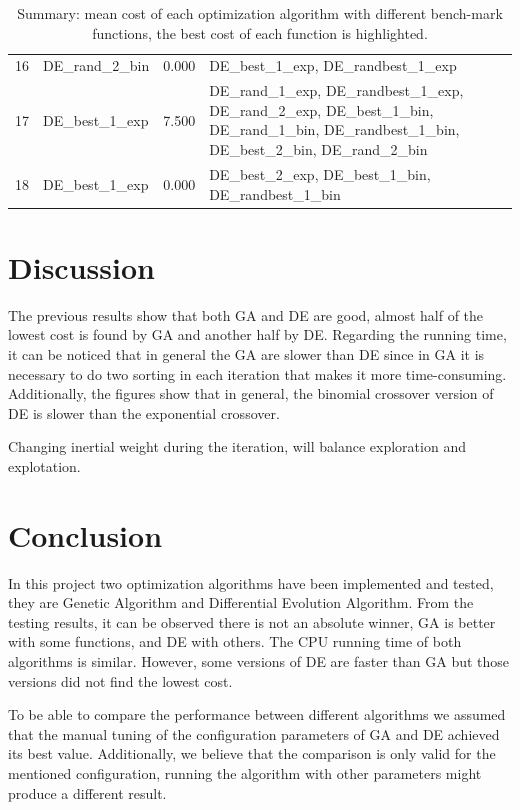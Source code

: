 \documentclass[12pt]{article}
\begin{document}
\begin{table}[H]
\begin{tabular}{rlrp{}}
 16 &  DE\_rand\_2\_bin & 0.000 &  DE\_best\_1\_exp, DE\_randbest\_1\_exp \\
 17 &  DE\_best\_1\_exp & 7.500 &  DE\_rand\_1\_exp, DE\_randbest\_1\_exp, DE\_rand\_2\_exp, DE\_best\_1\_bin, DE\_rand\_1\_bin, DE\_randbest\_1\_bin, DE\_best\_2\_bin, DE\_rand\_2\_bin \\
 18 &  DE\_best\_1\_exp & 0.000 &  DE\_best\_2\_exp, DE\_best\_1\_bin, DE\_randbest\_1\_bin \\
\bottomrule
\end{tabular}
\caption{Summary: mean cost of each optimization algorithm with different bench-mark functions, the best cost of each function is highlighted.} 
    \label{tab:summary_best}
\end{table}


\section{Discussion}

The previous results show that both GA and DE are good, almost half of the lowest cost is found by GA and another half by DE. Regarding the running time, it can be noticed that in general the GA are slower than DE since in GA it is necessary to do two sorting in each iteration that makes it more time-consuming. Additionally, the figures show that in general, the binomial crossover version of DE is slower than the exponential crossover.



Changing inertial weight during the iteration, will balance exploration and explotation. 

    \section{Conclusion}
    In this project two optimization algorithms have been implemented and tested, they are Genetic Algorithm and Differential Evolution Algorithm. From the testing results, it can be observed there is not an absolute winner, GA is better with some functions, and DE with others. The CPU running time of both algorithms is similar. However, some versions of DE are faster than GA but those versions did not find the lowest cost.  
 
   To be able to compare the performance between different algorithms we assumed that the manual tuning of the configuration parameters of GA and DE achieved its best value. Additionally, we believe that the comparison is only valid for the mentioned configuration, running the algorithm with other parameters might produce a different result.
\end{document}
